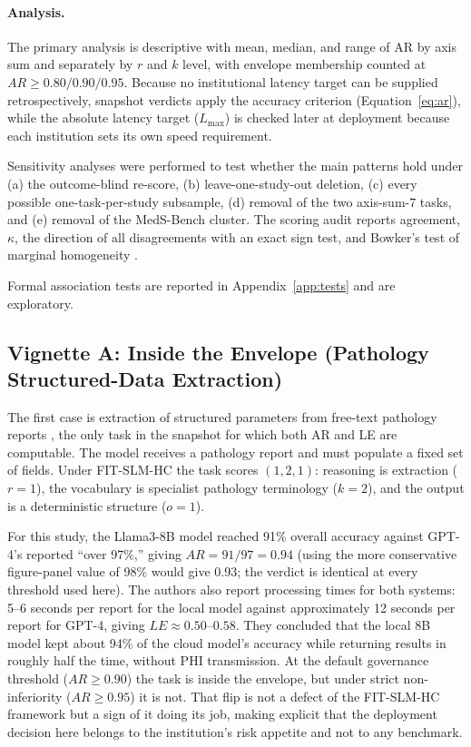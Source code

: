 \documentclass[11pt]{article}
\begin{document}
\paragraph{Analysis.}
The primary analysis is descriptive with mean, median, and range of AR by axis sum and separately by $r$ and $k$ level, with envelope membership counted at $AR \geq 0.80/0.90/0.95$. Because no institutional latency target can be supplied retrospectively, snapshot verdicts apply the accuracy criterion (Equation~\ref{eq:ar}), while the absolute latency target ($L_{\max}$) is checked later at deployment because each institution sets its own speed requirement.

Sensitivity analyses were performed to test whether the main patterns hold under (a) the outcome-blind re-score, (b) leave-one-study-out deletion, (c) every possible one-task-per-study subsample, (d) removal of the two axis-sum-7 tasks, and (e) removal of the MedS-Bench cluster. The scoring audit reports agreement, $\kappa$, the direction of all disagreements with an exact sign test, and Bowker's test of marginal homogeneity \cite{Bowker1948}.

Formal association tests are reported in Appendix~\ref{app:tests} and are exploratory.

\subsection{Vignette A: Inside the Envelope (Pathology Structured-Data Extraction)}
\label{sec:vignette-a}

The first case is extraction of structured parameters from free-text pathology reports \cite{Grothey2025}, the only task in the snapshot for which both AR and LE are computable. The model receives a pathology report and must populate a fixed set of fields. Under FIT-SLM-HC the task scores $(1, 2, 1)$: reasoning is extraction ($r=1$), the vocabulary is specialist pathology terminology ($k=2$), and the output is a deterministic structure ($o=1$).

For this study, the Llama3-8B model reached 91\% overall accuracy against GPT-4's reported ``over 97\%,'' giving $AR = 91/97 = 0.94$ (using the more conservative figure-panel value of 98\% would give 0.93; the verdict is identical at every threshold used here). The authors also report processing times for both systems: 5--6 seconds per report for the local model against approximately 12 seconds per report for GPT-4, giving $LE \approx 0.50$--$0.58$. They concluded that the local 8B model kept about 94\% of the cloud model's accuracy while returning results in roughly half the time, without PHI transmission. At the default governance threshold ($AR \geq 0.90$) the task is inside the envelope, but under strict non-inferiority ($AR \geq 0.95$) it is not. That flip is not a defect of the FIT-SLM-HC framework but a sign of it doing its job, making explicit that the deployment decision here belongs to the institution's risk appetite and not to any benchmark.
\end{document}
